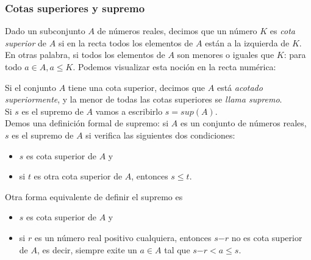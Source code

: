 \documentclass[Análisis.root.tex]{subfiles}
\begin{document}
        \subsubsection{Cotas superiores y supremo}
        Dado un subconjunto $A$ de números reales, decimos que un número $K$ es \textit{cota superior} de $A$ si en la recta todos los elementos de $A$ están a la izquierda de $K$. En otras palabra, si todos los elementos de $A$ son menores o iguales que $K$: para todo $a \in A, a \leq K$. Podemos visualizar esta noción en la recta numérica:
        \begin{center}
        \end{center}
        Si el conjunto $A$ tiene una cota superior, decimos que $A$ está \textit{acotado superiormente}, y la menor de todas las cotas superiores se \textit{llama supremo}.\\
        Si $s$ es el supremo de $A$ vamos a escribirlo $s = sup(A)$.\\
        Demos una definición formal de supremo: si $A$ es un conjunto de números reales, $s$ es el supremo de $A$ si verifica las siguientes dos condiciones:
        \begin{itemize}
            \item $s$ es cota superior de $A$ y
            \item si $t$ es otra cota superior de $A$, entonces $s \leq t$.
        \end{itemize}
        Otra forma equivalente de definir el supremo es
        \begin{itemize}
            \item $s$ es cota superior de $A$ y
            \item si $r$ es un número real positivo cualquiera, entonces $s \mathrm{-} r$ no es cota superior de $A$, es decir, siempre exite un $a \in A$ tal que $s \mathrm{-} r < a \leq s$.
        \end{itemize}
\end{document}
